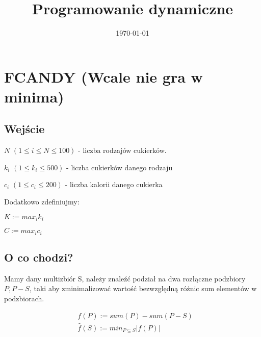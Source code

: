 \documentclass[paper=a4, fontsize=11pt]{article}
\title{	
\huge Programowanie dynamiczne
}
\date{\normalsize\today}
\begin{document}
\maketitle

\newtheorem{mydef}{Definicja}
\newtheorem{theorem}{Twierdzenie}
\newtheorem{lemma}{Lemat}
\newtheorem{observation}{Obserwacja}


\section{FCANDY (Wcale nie gra w minima)}
\subsection{Wejście}
\begin{description}
\item $N$ $(1 \leq i \leq N \leq 100)$ - liczba rodzajów cukierków.
\item $k_i$ $(1 \leq k_i \leq 500)$ - liczba cukierków danego rodzaju
\item $c_i$ $(1 \leq c_i \leq 200)$ - liczba kalorii danego cukierka
\end{description}
Dodatkowo zdefiniujmy:
\begin{description}
\item $K := max_i k_i$
\item $C := max_i c_i$
\end{description}

\subsection{O co chodzi?}

Mamy dany multizbiór S, należy znaleźć podział na dwa rozłączne podzbiory $P, P-S$, taki aby zminimalizować wartość bezwzględną różnic sum elementów w podzbiorach.

\begin{align*}
&f(P) := sum(P) - sum(P - S) \\
&\hat{f}(S) := min_{P \subseteq S} |f(P)|
\end{align*}
\end{document}
